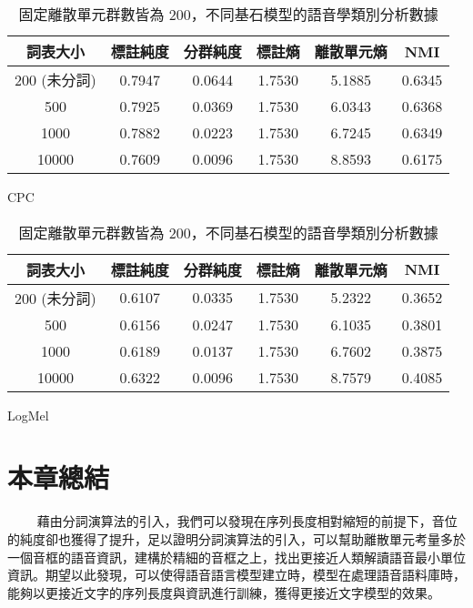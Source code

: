 \begin{table}[!htbp]
            \begin{subtable}[t]{\textwidth}
                \centering
                \begin{tabular}{|c|c|c|c|c|c|} \hline 
                        詞表大小  & 標註純度 & 分群純度 & 標註熵 & 離散單元熵 &     NMI  \\ \hline 
 200 (未分詞)&         0.7947 &   0.0644 &         1.7530 &     5.1885 &  0.6345 \\ \hline 
                            500 &  0.7925 &    0.0369 &   1.7530   & 6.0343 &    0.6368 \\ \hline %
                           1000 &  0.7882 &    0.0223 &   1.7530   & 6.7245 &    0.6349 \\ \hline %
                          10000 &  0.7609 &    0.0096 &   1.7530   & 8.8593 &    0.6175 \\ \hline %
                \end{tabular}
\caption{CPC}
                \label{tab:ch4-pcls-model-cpc}
            \end{subtable}        

            \vspace{0.01cm}        

            \begin{subtable}[t]{\textwidth}
                \centering
                \begin{tabular}{|c|c|c|c|c|c|} \hline 
                詞表大小 & 標註純度 & 分群純度 & 標註熵 & 離散單元熵 &     NMI \\ \hline 
  200 (未分詞)&         0.6107 &   0.0335 &         1.7530 &     5.2322 &  0.3652 \\ \hline 
                            500 &  0.6156 &    0.0247 &   1.7530   & 6.1035 &    0.3801 \\ \hline %
                           1000 &  0.6189 &    0.0137 &   1.7530   & 6.7602 &    0.3875 \\ \hline %
                          10000 &  0.6322 &    0.0096 &   1.7530   & 8.7579 &    0.4085 \\ \hline %
                \end{tabular}
\caption{LogMel}
                \label{tab:ch4-pcls-model-logmel}
            \end{subtable}        

\caption{固定離散單元群數皆為 200，不同基石模型的語音學類別分析數據}
            \label{tab:ch4-models-pcls}
        \end{table}
        

\section{本章總結}
　　
藉由分詞演算法的引入，我們可以發現在序列長度相對縮短的前提下，音位的純度卻也獲得了提升，足以證明分詞演算法的引入，可以幫助離散單元考量多於一個音框的語音資訊，建構於精細的音框之上，找出更接近人類解讀語音最小單位資訊。期望以此發現，可以使得語音語言模型建立時，模型在處理語音語料庫時，能夠以更接近文字的序列長度與資訊進行訓練，獲得更接近文字模型的效果。
